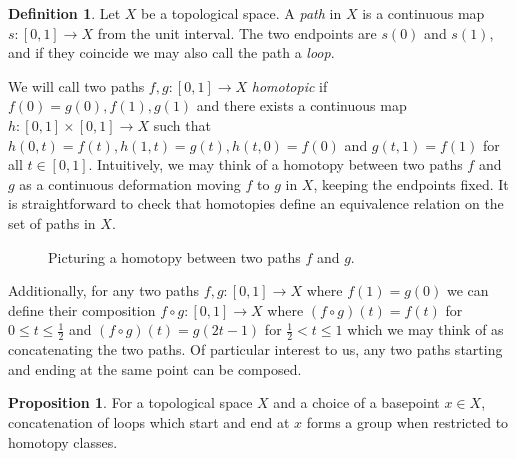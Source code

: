 \documentclass{article}
\theoremstyle{definition}
\newtheorem{proposition}[theorem]{Proposition}
\newtheorem{definition}[theorem]{Definition}
\theoremstyle{remark}
\begin{document}
\begin{definition}
	Let $X$ be a topological space. 
	A \textit{path} in $X$ is a continuous map $s: [0,1] \to X$ from the unit interval.
	The two endpoints are $s(0)$ and $s(1)$, and if they coincide we may also call the path a \textit{loop}.
\end{definition}

We will call two paths $f,g: [0,1] \to X$ \textit{homotopic} if $f(0) = g(0), f(1), g(1)$ and there exists a continuous map $h: [0,1] \times [0,1] \to X$ such that $h(0,t) = f(t), h(1,t) = g(t), h(t,0) = f(0)$ and $g(t,1) = f(1)$ for all $t \in [0,1]$.
Intuitively, we may think of a homotopy between two paths $f$ and $g$ as a continuous deformation moving $f$ to $g$ in $X$, keeping the endpoints fixed. 
It is straightforward to check that homotopies define an equivalence relation on the set of paths in $X$.\\

\begin{figure}[!h]
	\centering
{}
\caption{Picturing a homotopy between two paths $f$ and $g$.}
\end{figure}

\indent Additionally, for any two paths $f,g: [0,1] \to X$ where $f(1) = g(0)$ we can define their composition $f \circ g: [0,1] \to X$ where $(f \circ g )(t) = f(t)$ for $0 \leq t \leq \frac{1}{2}$ and $(f \circ g)(t) = g(2t - 1)$ for $ \frac{1}{2} < t \leq 1$ which we may think of as concatenating the two paths.
Of particular interest to us, any two paths starting and ending at the same point can be composed.

\begin{proposition}
	For a topological space $X$ and a choice of a basepoint $x \in X$, concatenation of loops which start and end at $x$ forms a group when restricted to homotopy classes.
\end{proposition}
\end{document}
